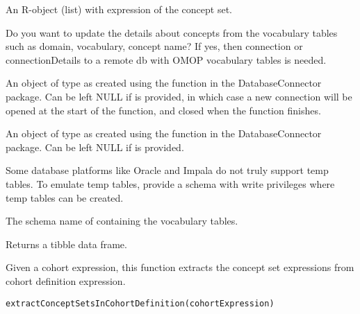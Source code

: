 \documentclass[a4paper]{book}
\begin{document}
%
\begin{Arguments}
\begin{ldescription}
\item[\code{conceptSetExpression}] An R-object (list) with expression of the concept set.

\item[\code{updateVocabularyFields}] Do you want to update the details about concepts from the vocabulary tables such as domain, 
vocabulary, concept name? If yes, then connection or connectionDetails to a 
remote db with OMOP vocabulary tables is needed.

\item[\code{connection}] An object of type  as created using the
 function in the
DatabaseConnector package. Can be left NULL if 
is provided, in which case a new connection will be opened at the start
of the function, and closed when the function finishes.

\item[\code{connectionDetails}] An object of type  as created using the
 function in the
DatabaseConnector package. Can be left NULL if  is
provided.

\item[\code{tempEmulationSchema}] Some database platforms like Oracle and Impala do not truly support temp tables. To emulate temp 
tables, provide a schema with write privileges where temp tables can be created.

\item[\code{vocabularyDatabaseSchema}] The schema name of containing the vocabulary tables.
\end{ldescription}
\end{Arguments}
%
\begin{Value}
Returns a tibble data frame.
\end{Value}
%
\begin{Description}\relax
Given a cohort expression, this function extracts the concept set
expressions from cohort definition expression.
\end{Description}
%
\begin{Usage}
\begin{verbatim}
extractConceptSetsInCohortDefinition(cohortExpression)
\end{verbatim}
\end{Usage}
\end{document}
